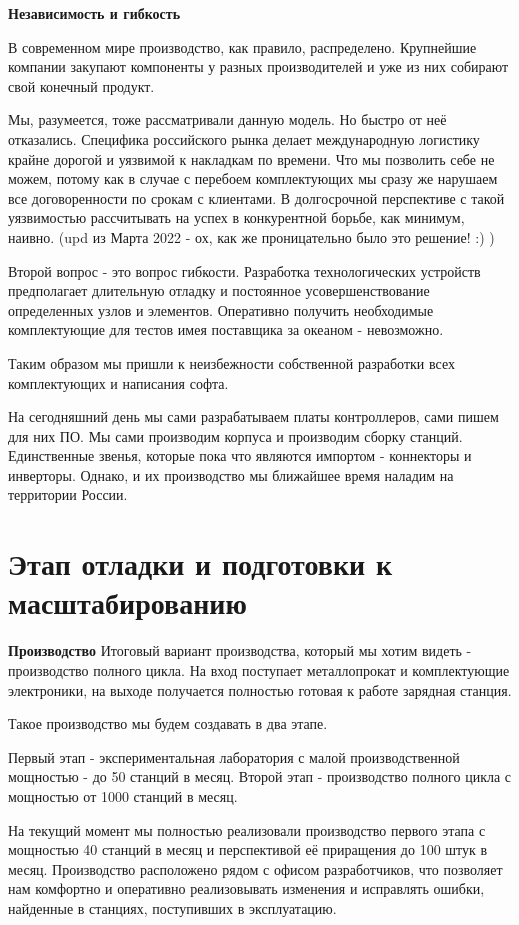 \documentclass[a4paper,12pt]{report}
\begin{document}
\textbf{Независимость и гибкость}

В современном мире производство, как правило, распределено. Крупнейшие компании закупают компоненты у разных производителей и уже из них собирают свой конечный продукт. 

Мы, разумеется, тоже рассматривали данную модель. Но быстро от неё отказались. Специфика российского рынка делает международную логистику крайне дорогой и уязвимой к накладкам по времени. Что мы позволить себе не можем, потому как в случае с перебоем комплектующих мы сразу же нарушаем все договоренности по срокам с клиентами. В долгосрочной перспективе с такой уязвимостью рассчитывать на успех в конкурентной борьбе, как минимум, наивно. (upd из Марта 2022 - ох, как же проницательно было это решение! :) ) 

Второй вопрос - это вопрос гибкости. Разработка технологических устройств предполагает длительную отладку и постоянное усовершенствование определенных узлов и элементов. Оперативно получить необходимые комплектующие для тестов имея поставщика за океаном - невозможно.

Таким образом мы пришли к неизбежности собственной разработки всех комплектующих и написания софта. 

На сегодняшний день мы сами разрабатываем платы контроллеров, сами пишем для них ПО. Мы сами производим корпуса и производим сборку станций. Единственные звенья, которые пока что являются импортом - коннекторы и инверторы. Однако, и их производство мы ближайшее время наладим на территории России. 

\section{Этап отладки и подготовки к масштабированию}
\textbf{Производство}
Итоговый вариант производства, который мы хотим видеть - производство полного цикла. На вход поступает металлопрокат и комплектующие электроники, на выходе получается полностью готовая к работе зарядная станция. 

Такое производство мы будем создавать в два этапе. 

Первый этап - экспериментальная лаборатория с малой производственной мощностью - до 50 станций в месяц. 
Второй этап - производство полного цикла с мощностью от 1000 станций в месяц. 

На текущий момент мы полностью реализовали производство первого этапа с мощностью 40 станций в месяц и перспективой её приращения до 100 штук в месяц. Производство расположено рядом с офисом разработчиков, что позволяет нам комфортно и оперативно реализовывать изменения и исправлять ошибки, найденные в станциях, поступивших в эксплуатацию.
\end{document}
